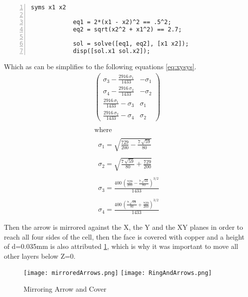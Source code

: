         \begin{lstlisting}[frame=single, numbers=left, style=Matlab-Pyglike]
            syms x1 x2

            eq1 = 2*(x1 - x2)^2 == .5^2;
            eq2 = sqrt(x2^2 + x1^2) == 2.7;

            sol = solve([eq1, eq2], [x1 x2]);
            disp([sol.x1 sol.x2]);  
        \end{lstlisting}
        
        Which as can be simplifies to the following equations \ref{eq:xysys}.
        \begin{equation}
            \label{eq:xysys}
            \displaystyle \begin{array}{l} 
                \left(\begin{array}{cc} 
                    \sigma_3 -\frac{2916\,\sigma_1 }{1433} & -\sigma_1 \\
                    \sigma_4 -\frac{2916\,\sigma_2 }{1433} & -\sigma_2 \\
                    \frac{2916\,\sigma_1 }{1433}-\sigma_3  & \sigma_1 \\
                    \frac{2916\,\sigma_2 }{1433}-\sigma_4  & \sigma_2  
                \end{array}\right)\\
                \mathrm{}\\
                \textrm{where}\\
                \mathrm{}\\
                \;\;\sigma_1 =\sqrt{\frac{729}{200}-\frac{7\,\sqrt{59}}{80}}\\
                \mathrm{}\\
                \;\;\sigma_2 =\sqrt{\frac{7\,\sqrt{59}}{80}+\frac{729}{200}}\\
                \mathrm{}\\
                \;\;\sigma_3 =\frac{400\,{{\left(\frac{729}{200}-\frac{7\,\sqrt{59}}{80}\right)}}^{3/2} }{1433}\\
                \mathrm{}\\
                \;\;\sigma_4 =\frac{400\,{{\left(\frac{7\,\sqrt{59}}{80}+\frac{729}{200}\right)}}^{3/2} }{1433}
            \end{array}
        \end{equation}

        Then the arrow is mirrored against the X, the Y and the XY planes in order to reach all four 
        sides of the cell, then the face is covered with copper and a height of d=0.035mm is also 
        attributed \ref{img:mirrorAndCover}, which is why it was important to move all other layers below Z=0. 
        \begin{figure}[h]
            \centering
            \texttt{[image: mirroredArrows.png]}\hfil
            \texttt{[image: RingAndArrows.png]}
            \caption{Mirroring Arrow and Cover}
            \label{img:mirrorAndCover}
        \end{figure}

